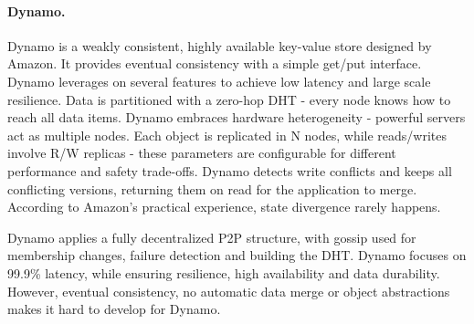 
\paragraph{Dynamo.} Dynamo \cite{dynamo} is a weakly consistent, highly available key-value store designed by Amazon.
It provides eventual consistency with a simple get/put interface.
Dynamo leverages on several features to achieve low latency and large scale resilience.
Data is partitioned with a zero-hop DHT - every node knows how to reach all data items.
Dynamo embraces hardware heterogeneity - powerful servers act as multiple nodes.
Each object is replicated in N nodes, while reads/writes involve R/W replicas - these parameters are configurable for different performance and safety trade-offs.
Dynamo detects write conflicts and keeps all conflicting versions, returning them on read for the application to merge.
According to Amazon's practical experience, state divergence rarely happens.

Dynamo applies a fully decentralized P2P structure, with gossip used for membership changes, failure detection and building the DHT.
Dynamo focuses on 99.9\% latency, while ensuring resilience, high availability and data durability.
However, eventual consistency, no automatic data merge or object abstractions makes it hard to develop for Dynamo.


